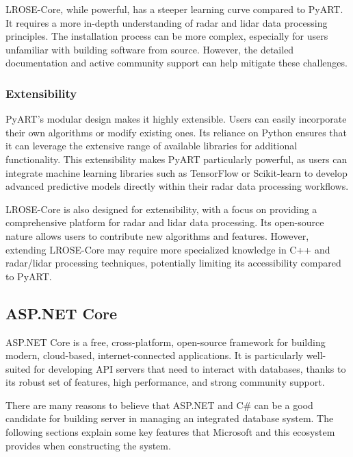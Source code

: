 LROSE-Core, while powerful, has a steeper learning curve compared to PyART. It
requires a more in-depth understanding of radar and lidar data processing
principles. The installation process can be more complex, especially for users
unfamiliar with building software from source. However, the detailed
documentation and active community support can help mitigate these challenges.

\subsubsection*{Extensibility}
PyART's modular design makes it highly extensible. Users can easily incorporate
their own algorithms or modify existing ones. Its reliance on Python ensures
that it can leverage the extensive range of available libraries for additional
functionality. This extensibility makes PyART particularly powerful, as users
can integrate machine learning libraries such as TensorFlow or Scikit-learn to
develop advanced predictive models directly within their radar data processing
workflows.

LROSE-Core is also designed for extensibility, with a focus on providing a
comprehensive platform for radar and lidar data processing. Its open-source
nature allows users to contribute new algorithms and features. However,
extending LROSE-Core may require more specialized knowledge in C++ and
radar/lidar processing techniques, potentially limiting its accessibility
compared to PyART.


\subsection{ASP.NET Core}
ASP.NET Core is a free, cross-platform, open-source framework for building
modern, cloud-based, internet-connected applications. It is particularly
well-suited for developing API servers that need to interact with databases,
thanks to its robust set of features, high performance, and strong community
support.

There are many reasons to believe that ASP.NET and C\# can be a good candidate
for building server in managing an integrated database system. The following
sections explain some key features that Microsoft and this ecosystem provides
when constructing the system.

